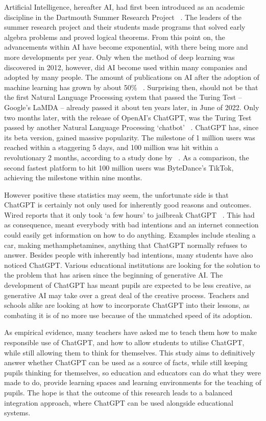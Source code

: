 \documentclass[a4paper,12pt]{report}
\begin{document}
Artificial Intelligence, hereafter AI, had first been introduced as an academic discipline in the Dartmouth Summer Research Project ~\cite{mccarthy55}. The leaders of the summer research project and their students made programs that solved early algebra problems and proved logical theorems. From this point on, the advancements within AI have become exponential, with there being more and more developments per year. Only when the method of deep learning was discovered in 2012, however, did AI become used within many companies and adopted by many people. The amount of publications on AI after the adoption of machine learning has grown by about 50\% ~\cite{unesco2021sciencereport}. Surprising then, should not be that the first Natural Language Processing system that passed the Turing Test – Google’s LaMDA – already passed it about ten years later, in June of 2022. Only two months later, with the release of OpenAI’s ChatGPT, was the Turing Test passed by another Natural Language Processing ‘chatbot’ ~\cite{biever2023chatgpt}. ChatGPT has, since its beta version, gained massive popularity. The milestone of 1 million users was reached within a staggering 5 days, and 100 million was hit within a revolutionary 2 months, according to a study done by ~\cite{hu2023chatgptreuters}. As a comparison, the second fastest platform to hit 100 million users was ByteDance’s TikTok, achieving the milestone within nine months.


However positive these statistics may seem, the unfortunate side is that ChatGPT is certainly not only used for inherently good reasons and outcomes. Wired reports that it only took ‘a few hours’ to jailbreak ChatGPT ~\cite{burgess2023bchatgpthacking}. This had as consequence, meant everybody with bad intentions and an internet connection could easily get information on how to do anything. Examples include stealing a car, making methamphetamines, anything that ChatGPT normally refuses to answer. Besides people with inherently bad intentions, many students have also noticed ChatGPT. Various educational institutions are looking for the solution to the problem that has arisen since the beginning of generative AI. The development of ChatGPT has meant pupils are expected to be less creative, as generative AI may take over a great deal of the creative process. Teachers and schools alike are looking at how to incorporate ChatGPT into their lessons, as combating it is of no more use because of the unmatched speed of its adoption.


As empirical evidence, many teachers have asked me to teach them how to make responsible use of ChatGPT, and how to allow students to utilise ChatGPT, while still allowing them to think for themselves. This study aims to definitively answer whether ChatGPT can be used as a source of facts, while still keeping pupils thinking for themselves, so education and educators can do what they were made to do, provide learning spaces and learning environments for the teaching of pupils. The hope is that the outcome of this research leads to a balanced integration approach, where ChatGPT can be used alongside educational systems.
\end{document}
